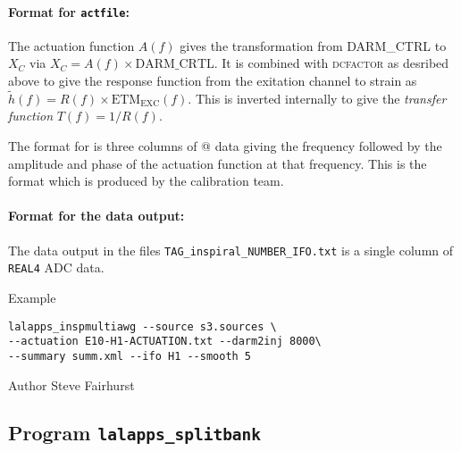 \begin{entry}
\paragraph{Format for \texttt{actfile}:} The actuation function $A(f)$
gives the transformation from DARM\_CTRL to $X_{C}$ via $X_{C} = A(f) 
\times \mathrm{DARM}\_\mathrm{CRTL}$.   It is combined with
\textsc{dcfactor} as desribed above to give the response function from
the exitation channel to strain as
$\tilde{h}(f)=R(f) \times \mathrm{ETM}_\mathrm{EXC}(f)$.  This is inverted internally 
to give the \emph{transfer function} $T(f)=1/R(f)$. 

The format for \verb@actfile@ is three columns of @ data giving the 
frequency followed by the amplitude and phase of the actuation function
at that frequency.  This is the format which is produced by the
calibration team.

\paragraph{Format for the data output:} The data output in the files
\verb$TAG_inspiral_NUMBER_IFO.txt$ is a single column of \verb$REAL4$ ADC data.

\item[Example]
\begin{verbatim}
lalapps_inspmultiawg --source s3.sources \
--actuation E10-H1-ACTUATION.txt --darm2inj 8000\ 
--summary summ.xml --ifo H1 --smooth 5
\end{verbatim}

\item[Author] 
Steve Fairhurst
\end{entry}
\clearpage


\subsection{Program \texttt{lalapps\_splitbank}}
\label{program:lalapps-splitbank}
\idx[Program]{lalapps\_splitbank}

